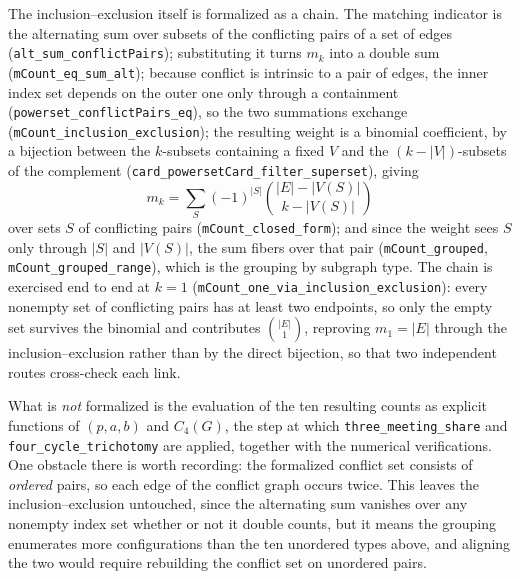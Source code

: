 \documentclass[11pt]{article}
\theoremstyle{remark}
\begin{document}
The inclusion--exclusion itself is formalized as a chain. The matching indicator is
the alternating sum over subsets of the conflicting pairs of a set of edges
(\texttt{alt\_sum\_conflictPairs}); substituting it turns $m_k$ into a double sum
(\texttt{mCount\_eq\_sum\_alt}); because conflict is intrinsic to a pair of edges,
the inner index set depends on the outer one only through a containment
(\texttt{powerset\_conflictPairs\_eq}), so the two summations exchange
(\texttt{mCount\_inclusion\_exclusion}); the resulting weight is a binomial
coefficient, by a bijection between the $k$-subsets containing a fixed $V$ and the
$(k-|V|)$-subsets of the complement
(\texttt{card\_powersetCard\_filter\_superset}), giving
\[
m_k=\sum_{S}(-1)^{|S|}\binom{|E|-|V(S)|}{k-|V(S)|}
\]
over sets $S$ of conflicting pairs (\texttt{mCount\_closed\_form}); and since the
weight sees $S$ only through $|S|$ and $|V(S)|$, the sum fibers over that pair
(\texttt{mCount\_grouped}, \texttt{mCount\_grouped\_range}), which is the grouping
by subgraph type. The chain is exercised end to end at $k=1$
(\texttt{mCount\_one\_via\_inclusion\_exclusion}): every nonempty set of
conflicting pairs has at least two endpoints, so only the empty set survives the
binomial and contributes $\binom{|E|}{1}$, reproving $m_1=|E|$ through the
inclusion--exclusion rather than by the direct bijection, so that two independent
routes cross-check each link.

What is \emph{not} formalized is the evaluation of the ten resulting counts as
explicit functions of $(p,a,b)$ and $C_4(G)$, the step at which
\texttt{three\_meeting\_share} and \texttt{four\_cycle\_trichotomy} are applied, together with the numerical verifications. One obstacle there is worth recording:
the formalized conflict set consists of \emph{ordered} pairs, so each edge of the
conflict graph occurs twice. This leaves the inclusion--exclusion untouched, since
the alternating sum vanishes over any nonempty index set whether or not it double
counts, but it means the grouping enumerates more configurations than the ten
unordered types above, and aligning the two would require rebuilding the conflict
set on unordered pairs.
\end{document}
